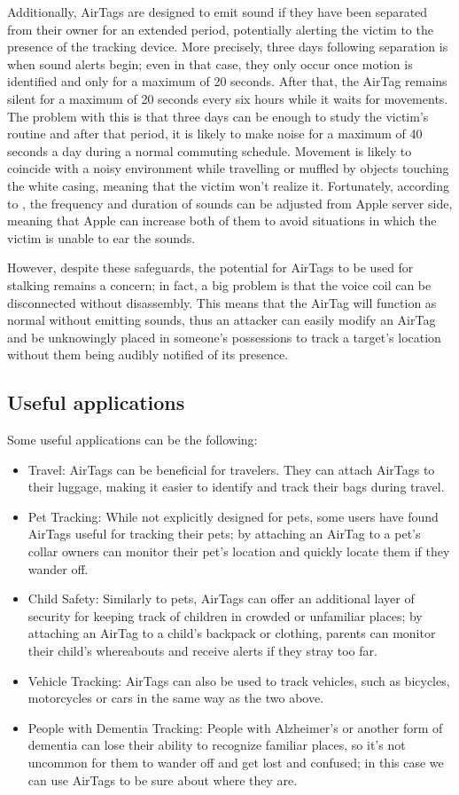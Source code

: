 \documentclass[english]{article}
\begin{document}
Additionally, AirTags are designed to emit sound if they have been separated from their owner for an extended period, potentially alerting the victim to the presence of the tracking device. More precisely, three days following separation is when sound alerts begin; even in that case, they only occur once motion is identified and only for a maximum of 20 seconds. After that, the AirTag remains silent for a maximum of 20 seconds every six hours while it waits for movements. The problem with this is that three days can be enough to study the victim's routine and after that period, it is likely to make noise for a maximum of 40 seconds a day during a normal commuting schedule. Movement is likely to coincide with a noisy environment while travelling or muffled by objects touching the white casing, meaning that the victim won't realize it. Fortunately, according to \cite{server}, the frequency and duration of sounds can be adjusted from Apple server side, meaning that Apple can increase both of them to avoid situations in which the victim is unable to ear the sounds.

However, despite these safeguards, the potential for AirTags to be used for stalking remains a concern; in fact, a big problem is that the voice coil can be disconnected without disassembly. This means that the AirTag will function as normal without emitting sounds, thus an attacker can easily modify an AirTag and be unknowingly placed in someone’s possessions to track a target’s location without them being audibly notified of its presence.
\subsection{Useful applications}
Some useful applications can be the following:
\begin{itemize}
  \item Travel: AirTags can be beneficial for travelers. They can attach AirTags to their luggage, making it easier to identify and track their bags during travel. 
  \item Pet Tracking: While not explicitly designed for pets, some users have found AirTags useful for tracking their pets; by attaching an AirTag to a pet's collar owners can monitor their pet's location and quickly locate them if they wander off.
  \item Child Safety: Similarly to pets, AirTags can offer an additional layer of security for keeping track of children in crowded or unfamiliar places; by attaching an AirTag to a child's backpack or clothing, parents can monitor their child's whereabouts and receive alerts if they stray too far.
  \item Vehicle Tracking: AirTags can also be used to track vehicles, such as bicycles, motorcycles or cars in the same way as the two above.
  \item People with Dementia Tracking: People with Alzheimer's or another form of dementia can lose their ability to recognize familiar places, so it's not uncommon for them to wander off and get lost and confused; in this case we can use AirTags to be sure about where they are.
\end{itemize}





\printbibliography
\nocite{*}
\end{document}

